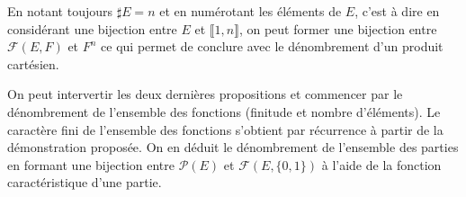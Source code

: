 \begin{rem}
  En notant toujours $\sharp E = n$ et en numérotant les éléments de $E$, c'est à dire en considérant une bijection entre $E$ et $\llbracket 1,n \rrbracket$, on peut former une bijection entre $\mathcal{F}(E,F)$ et $F^n$ ce qui permet de conclure avec le dénombrement d'un produit cartésien.
\end{rem}
\begin{rem}
 On peut intervertir les deux dernières propositions et commencer par le dénombrement de l'ensemble des fonctions (finitude et nombre d'éléments). Le caractère fini de l'ensemble des fonctions s'obtient par récurrence à partir de la démonstration proposée. On en déduit le dénombrement de l'ensemble des parties en formant une bijection entre $\mathcal P(E)$ et $\mathcal F(E,\{0,1\})$ à l'aide de la fonction caractéristique d'une partie. 
\end{rem}

